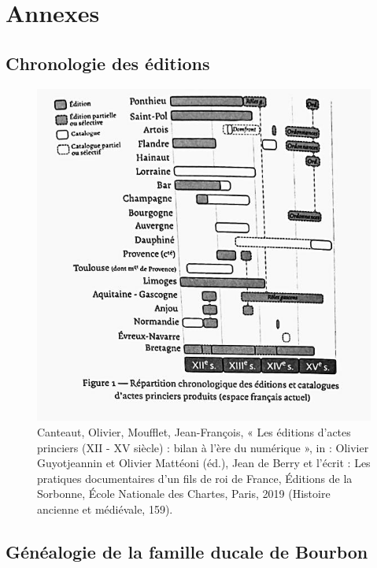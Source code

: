 \chapter{Annexes}

\section*{Chronologie des éditions}

\begin{figure}[ht]
    \centering
    \includegraphics[scale=0.6]{front/images/repartition_chronologique_editions.jpeg}
    \caption*{Canteaut, Olivier, Moufflet, Jean-François, « Les éditions d’actes princiers (\textsc{XII} - \textsc{XV} siècle) : bilan à l’ère du numérique », in : Olivier Guyotjeannin et Olivier Mattéoni (éd.), Jean de Berry et l’écrit : Les pratiques documentaires d’un fils de roi de France, Éditions de la Sorbonne, École Nationale des Chartes, Paris, 2019 (Histoire ancienne et médiévale, 159).}
    \label{fig:chrono_ed}
\end{figure}

\section*{Généalogie de la famille ducale de Bourbon}

